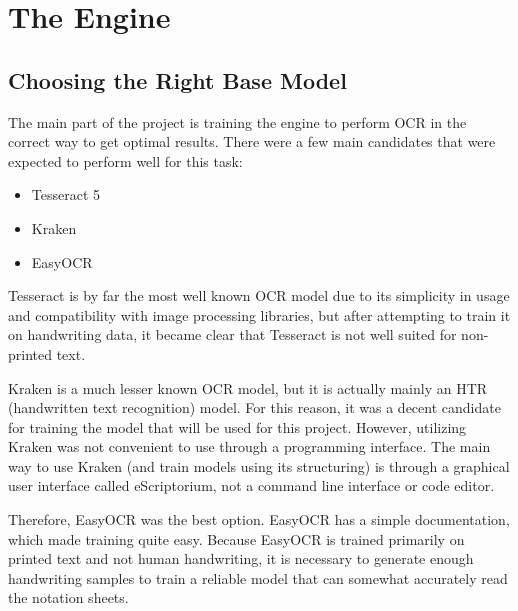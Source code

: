 \documentclass[12pt, two column, letterpaper]{article}
\begin{document}

\newpage


\section{The Engine}

\subsection{Choosing the Right Base Model}

The main part of the project is training the engine to perform OCR in the correct way to get optimal results. There were
a few main candidates that were expected to perform well for this task:
\begin{itemize}
    \item Tesseract 5
    \item Kraken
    \item EasyOCR
\end{itemize}
Tesseract is by far the most well known OCR model due to its simplicity in usage and compatibility with image processing
libraries, but after attempting to train it on handwriting data, it became clear that Tesseract is not well suited for 
non-printed text.

Kraken is a much lesser known OCR model, but it is actually mainly an HTR (handwritten text recognition) model. For this
reason, it was a decent candidate for training the model that will be used for this project. However, utilizing Kraken
was not convenient to use through a programming interface. The main way to use Kraken (and train models using its
structuring) is through a graphical user interface called eScriptorium, not a command line interface or code editor.

Therefore, EasyOCR was the best option. EasyOCR has a simple documentation, which made training quite easy.
Because EasyOCR is trained primarily on printed text and not human handwriting, it is necessary to generate enough
handwriting samples to train a reliable model that can somewhat accurately read the notation sheets.
\end{document}
